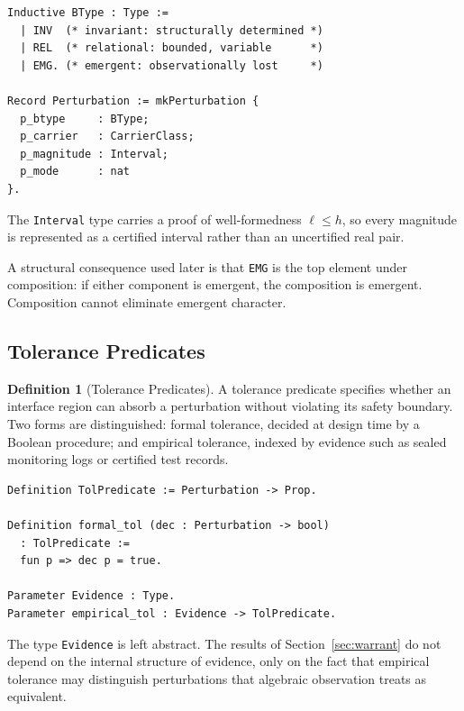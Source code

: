 \documentclass[pdflatex,sn-mathphys-num]{sn-jnl}
\theoremstyle{plain}
\theoremstyle{definition}
\newtheorem{definition}[theorem]{Definition}
\theoremstyle{remark}
\begin{document}
\begin{lstlisting}[style=rocq,
caption={Boundary types and perturbation record.}]
Inductive BType : Type :=
  | INV  (* invariant: structurally determined *)
  | REL  (* relational: bounded, variable      *)
  | EMG. (* emergent: observationally lost     *)

Record Perturbation := mkPerturbation {
  p_btype     : BType;
  p_carrier   : CarrierClass;
  p_magnitude : Interval;
  p_mode      : nat
}.
\end{lstlisting}

The \texttt{Interval} type carries a proof of well-formedness
$\ell \leq h$, so every magnitude is represented as a certified
interval rather than an uncertified real pair.

A structural consequence used later is that \texttt{EMG} is the top
element under composition: if either component is emergent, the
composition is emergent.
Composition cannot eliminate emergent character.

\subsection{Tolerance Predicates}

\begin{definition}[Tolerance Predicates]

A tolerance predicate specifies whether an interface region can absorb
a perturbation without violating its safety boundary.
Two forms are distinguished: formal tolerance, decided at design time
by a Boolean procedure; and empirical tolerance, indexed by evidence
such as sealed monitoring logs or certified test records.

\end{definition}

\begin{lstlisting}[style=rocq,
caption={Tolerance predicates.}]
Definition TolPredicate := Perturbation -> Prop.

Definition formal_tol (dec : Perturbation -> bool)
  : TolPredicate :=
  fun p => dec p = true.

Parameter Evidence : Type.
Parameter empirical_tol : Evidence -> TolPredicate.
\end{lstlisting}

The type \texttt{Evidence} is left abstract.
The results of Section~\ref{sec:warrant} do not depend on the internal
structure of evidence, only on the fact that empirical tolerance may
distinguish perturbations that algebraic observation treats as
equivalent.
\end{document}
